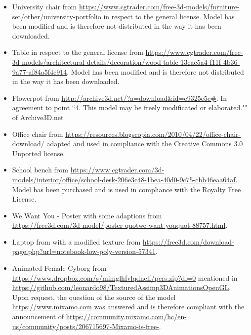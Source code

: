 \documentclass[12pt]{article}
\begin{document}
\begin{itemize}
\item University chair from \url{https://www.cgtrader.com/free-3d-models/furniture-set/other/university-portfolio} in respect to the general license. Model has been modified and is therefore not distributed in the way it has been downloaded.

\item Table in respect to the general license from \url{https://www.cgtrader.com/free-3d-models/architectural-details/decoration/wood-table-13cac5a4-f11f-4b36-9a77-af84a5f4c914}. Model has been modified and is therefore not distributed in the way it has been downloaded.

\item Flowerpot from \url{http://archive3d.net/?a=download\&id=e9325e5e#}. In agreement to point ``4. This model may be freely modificated or elaborated."" of Archive3D.net


\item Office chair from \url{https://resources.blogscopia.com/2010/04/22/office-chair-download/} adapted and used in compliance with the Creative Commons 3.0 Unported license.

\item School bench from
\url{ https://www.cgtrader.com/3d-models/interior/office/school-desk-206e3c48-1bea-40d0-9c75-cbb46eaa64af}. Model has been purchased and is used in compliance with the Royalty Free License.

\item We Want You - Poster with some adaptions from \\ \url{https://free3d.com/3d-model/poster-quotwe-want-youquot-88757.html}.

\item Laptop from with a modified texture from
\url{https://free3d.com/download-page.php?url=notebook-low-poly-version-57341}.
\item Animated Female Cyborg from \url{https://www.dropbox.com/s/mimglhfvlqdnelf/pers.zip?dl=0} mentioned in \url{https://github.com/leonardo98/TexturedAssimp3DAnimationsOpenGL}. Upon request, the question of the  source of the model \url{https://www.mixamo.com} was answered and is therefore compliant with the announcement of \url{https://community.mixamo.com/hc/en-us/community/posts/206715697-Mixamo-is-free-}.


\end{itemize}
\end{document}
